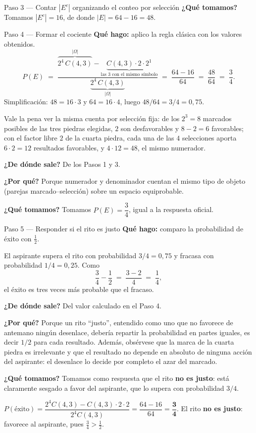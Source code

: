 \documentclass[11pt]{article}
\begin{document}
\begin{sol}
\begin{paso}{Paso 3 --- Contar $|E^{c}|$ organizando el conteo por selecci\'on}
\textbf{¿Qu\'e tomamos?} Tomamos $|E^{c}|=16$, de donde $|E|=64-16=48$.
\end{paso}

\begin{paso}{Paso 4 --- Formar el cociente}
\textbf{Qu\'e hago:} aplico la regla cl\'asica con los valores obtenidos.
\[
P(E)\;=\;\frac{\overbrace{2^{4}\,C(4,3)}^{|\Omega|}-\underbrace{C(4,3)\cdot 2\cdot 2^{1}}_{\text{las 3 con el mismo s\'imbolo}}}{\underbrace{2^{4}\,C(4,3)}_{|\Omega|}}
\;=\;\frac{64-16}{64}\;=\;\frac{48}{64}\;=\;\frac{3}{4}.
\]
Simplificaci\'on: $48=16\cdot 3$ y $64=16\cdot 4$, luego $48/64=3/4=0{,}75$.

Vale la pena ver la misma cuenta por selecci\'on fija: de los $2^{3}=8$ marcados posibles de las tres piedras elegidas, $2$ son desfavorables y $8-2=6$ favorables; con el factor libre $2$ de la cuarta piedra, cada una de las $4$ selecciones aporta $6\cdot 2=12$ resultados favorables, y $4\cdot 12=48$, el mismo numerador.

\textbf{¿De d\'onde sale?} De los Pasos 1 y 3.

\textbf{¿Por qu\'e?} Porque numerador y denominador cuentan el mismo tipo de objeto (parejas marcado--selecci\'on) sobre un espacio equiprobable.

\textbf{¿Qu\'e tomamos?} Tomamos $P(E)=\dfrac{3}{4}$, igual a la respuesta oficial.
\end{paso}

\begin{paso}{Paso 5 --- Responder si el rito es justo}
\textbf{Qu\'e hago:} comparo la probabilidad de \'exito con $\tfrac12$.

El aspirante supera el rito con probabilidad $3/4=0{,}75$ y fracasa con probabilidad $1/4=0{,}25$. Como
\[
\frac{3}{4}-\frac{1}{2}\;=\;\frac{3-2}{4}\;=\;\frac{1}{4},
\]
el \'exito es tres veces m\'as probable que el fracaso.

\textbf{¿De d\'onde sale?} Del valor calculado en el Paso 4.

\textbf{¿Por qu\'e?} Porque un rito ``justo'', entendido como uno que no favorece de antemano ning\'un desenlace, deber\'ia repartir la probabilidad en partes iguales, es decir $1/2$ para cada resultado. Adem\'as, obs\'ervese que la marca de la cuarta piedra es irrelevante y que el resultado no depende en absoluto de ninguna acci\'on del aspirante: el desenlace lo decide por completo el azar del marcado.

\textbf{¿Qu\'e tomamos?} Tomamos como respuesta que el rito \textbf{no es justo}: est\'a claramente sesgado a favor del aspirante, que lo supera con probabilidad $3/4$.
\end{paso}

\end{sol}

\begin{resp}
$P(\text{\'exito})=\dfrac{2^{4}C(4,3)-C(4,3)\cdot 2\cdot 2}{2^{4}C(4,3)}=\dfrac{64-16}{64}=\mathbf{\dfrac{3}{4}}$. El rito \textbf{no es justo}: favorece al aspirante, pues $\tfrac34>\tfrac12$.
\end{resp}
\end{document}
